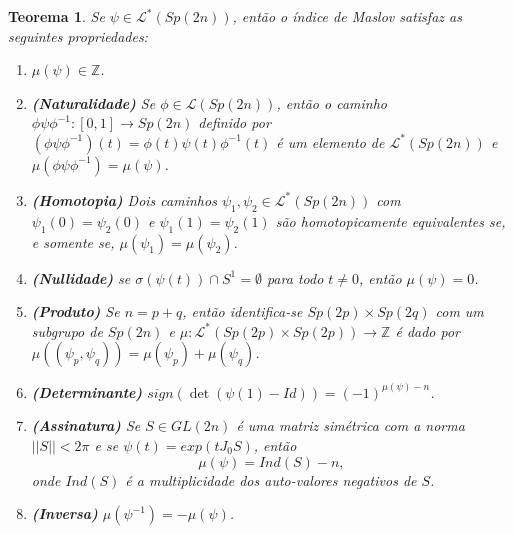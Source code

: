 \documentclass[12pt]{book}
\newtheorem{teorema}{Teorema}[section]
\newcommand{\caminhosespeciais}[1]{\mathcal{L}^{*}(#1)}
\newcommand{\caminhos}{\mathcal{L}}
\newcommand{\caminhossempontobase}[1]{\caminhos(#1)}
\newcommand{\circulo}{S^{1}}
\newcommand{\dominioMaslov}{\caminhos^{*}(\gruposimpletico{2n})}
\newcommand{\espectrooperador}[1]{\sigma(#1)}
\newcommand{\estruturacomplexa}{J_{0}}
\newcommand{\gruposimpletico}[1]{Sp(#1)}
\newcommand{\inteiros}{\mathbb{Z}}
\newcommand{\intervalo}{[0,1]}
\begin{document}
	
	\begin{teorema}\label{teorema_indice_maslov}
		Se $\psi \in \dominioMaslov$, então o índice de Maslov satisfaz as seguintes propriedades:
		\begin{enumerate}
			\item $\mu(\psi) \in \inteiros$.
			
			\item \textbf{(Naturalidade)}\label{item_naturalidade_maslov} Se $\phi\in \caminhossempontobase{\gruposimpletico{2n}}$, então o caminho $\phi\psi\phi^{-1}: \intervalo \to \gruposimpletico{2n}$ definido por $(\phi\psi\phi^{-1})(t) = \phi(t)\psi(t)\phi^{-1}(t)$ é um elemento de $\caminhosespeciais{\gruposimpletico{2n}}$ e $\mu(\phi\psi\phi^{-1}) = \mu(\psi)$.
			
			\item \textbf{(Homotopia)} \label{item_homotopia_caminhos_teorema_indice_maslov} Dois caminhos $\psi_{1}, \psi_{2}\in \dominioMaslov $ com $\psi_{1}(0) = \psi_{2}(0)$ e $\psi_{1}(1) = \psi_{2}(1)$ são homotopicamente equivalentes se, e somente se, $\mu(\psi_{1}) = \mu(\psi_{2})$.
			
			\item \textbf{(Nullidade)} se $\espectrooperador{\psi(t)}\cap \circulo = \emptyset$ para todo $t\neq 0$, então $\mu(\psi) = 0$.
			
			\item \textbf{(Produto)} Se $n=p+q$, então identifica-se $\gruposimpletico{2p}\times \gruposimpletico{2q}$ com um subgrupo de $\gruposimpletico{2n}$ e $\mu:\caminhosespeciais{\gruposimpletico{2p}\times \gruposimpletico{2p}} \to \inteiros$ é dado por $\mu((\psi_{p}, \psi_{q})) = \mu(\psi_{p})+\mu(\psi_{q})$.
			
			\item \textbf{(Determinante)} $sign(\det(\psi(1)-Id)) = (-1)^{\mu(\psi)-n}$.
			
			\item \textbf{(Assinatura)}\label{item_assinatura_maslov} Se $S \in GL(2n)$ é uma matriz simétrica com a norma $||S|| < 2\pi$ e se $\psi(t) = exp(t\estruturacomplexa S)$, então 
			$$
			\mu(\psi) = Ind(S) - n,
			$$
			onde $Ind(S)$ é a multiplicidade dos auto-valores negativos de $S$.
			
			\item \textbf{(Inversa)} $\mu(\psi^{-1}) = -\mu(\psi)$.
			
		\end{enumerate}
	\end{teorema}
\end{document}
